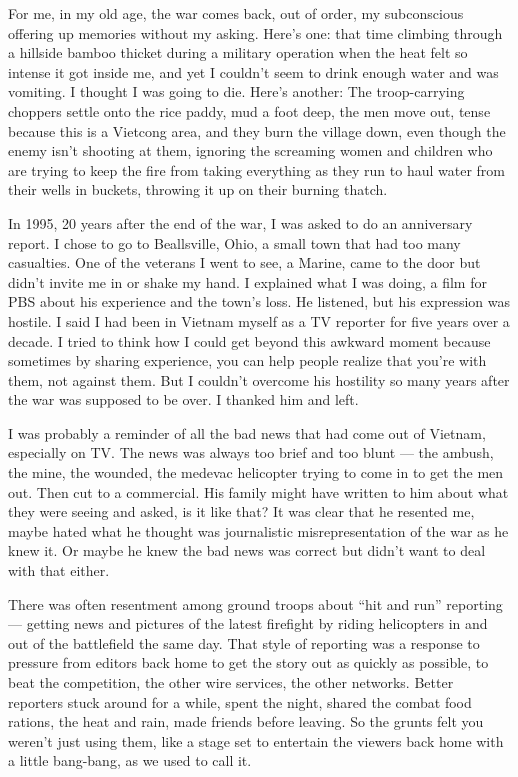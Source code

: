 For me, in my old age, the war comes back, out of order, my subconscious
offering up memories without my asking. Here's one: that time climbing
through a hillside bamboo thicket during a military operation when the
heat felt so intense it got inside me, and yet I couldn't seem to drink
enough water and was vomiting. I thought I was going to die. Here's
another: The troop-carrying choppers settle onto the rice paddy, mud a
foot deep, the men move out, tense because this is a Vietcong area, and
they burn the village down, even though the enemy isn't shooting at
them, ignoring the screaming women and children who are trying to keep
the fire from taking everything as they run to haul water from their
wells in buckets, throwing it up on their burning thatch.

In 1995, 20 years after the end of the war, I was asked to do an
anniversary report. I chose to go to Beallsville, Ohio, a small town
that had too many casualties. One of the veterans I went to see, a
Marine, came to the door but didn't invite me in or shake my hand. I
explained what I was doing, a film for PBS about his experience and the
town's loss. He listened, but his expression was hostile. I said I had
been in Vietnam myself as a TV reporter for five years over a decade. I
tried to think how I could get beyond this awkward moment because
sometimes by sharing experience, you can help people realize that you're
with them, not against them. But I couldn't overcome his hostility so
many years after the war was supposed to be over. I thanked him and
left.

I was probably a reminder of all the bad news that had come out of
Vietnam, especially on TV. The news was always too brief and too blunt
--- the ambush, the mine, the wounded, the medevac helicopter trying to
come in to get the men out. Then cut to a commercial. His family might
have written to him about what they were seeing and asked, is it like
that? It was clear that he resented me, maybe hated what he thought was
journalistic misrepresentation of the war as he knew it. Or maybe he
knew the bad news was correct but didn't want to deal with that either.

There was often resentment among ground troops about ``hit and run''
reporting --- getting news and pictures of the latest firefight by
riding helicopters in and out of the battlefield the same day. That
style of reporting was a response to pressure from editors back home to
get the story out as quickly as possible, to beat the competition, the
other wire services, the other networks. Better reporters stuck around
for a while, spent the night, shared the combat food rations, the heat
and rain, made friends before leaving. So the grunts felt you weren't
just using them, like a stage set to entertain the viewers back home
with a little bang-bang, as we used to call it.

